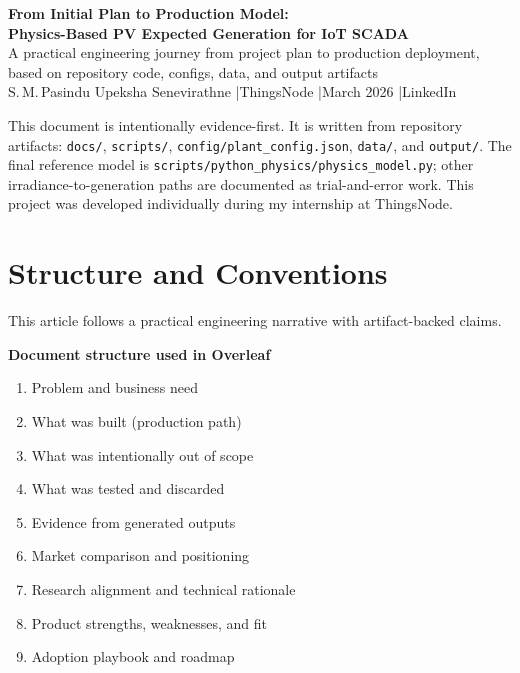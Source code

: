 \documentclass[11pt,a4paper]{article}
\newcommand{\artifact}[1]{\texttt{#1}}
\begin{document}
\begin{center}
  {\fontsize{21}{27}\selectfont\bfseries\color{textdark}
  From Initial Plan to Production Model:\\
  Physics-Based PV Expected Generation for IoT SCADA}\\[8pt]
  {\large\color{brandblue}
  A practical engineering journey from project plan to production deployment,\\
  based on repository code, configs, data, and output artifacts}\\[10pt]
  {\small\color{textmuted}
  S.\,M.\,Pasindu Upeksha Senevirathne \quad|\quad ThingsNode \quad|\quad March 2026 \quad|\quad LinkedIn}
\end{center}

\begin{insightbox}
This document is intentionally evidence-first. It is written from repository artifacts:
\artifact{docs/}, \artifact{scripts/}, \artifact{config/plant\_config.json},
\artifact{data/}, and \artifact{output/}. The final reference model is
\artifact{scripts/python\_physics/physics\_model.py}; other irradiance-to-generation paths are documented as trial-and-error work.
This project was developed individually during my internship at ThingsNode.
\end{insightbox}

\section{Structure and Conventions}

This article follows a practical engineering narrative with artifact-backed claims.

\textbf{Document structure used in Overleaf}
\begin{enumerate}
  \item Problem and business need
  \item What was built (production path)
  \item What was intentionally out of scope
  \item What was tested and discarded
  \item Evidence from generated outputs
  \item Market comparison and positioning
  \item Research alignment and technical rationale
  \item Product strengths, weaknesses, and fit
  \item Adoption playbook and roadmap
\end{enumerate}
\end{document}
